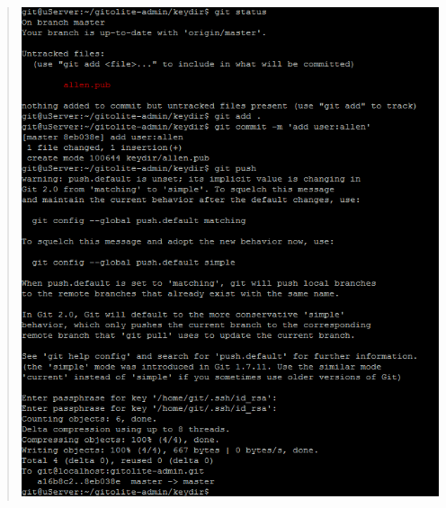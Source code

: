 \documentclass[letterpaper,10pt,english]{sphinxmanual}
\begin{document}
\begin{quote}
\includegraphics{gitolite3-adduser-3.png}
\end{quote}
\end{document}
